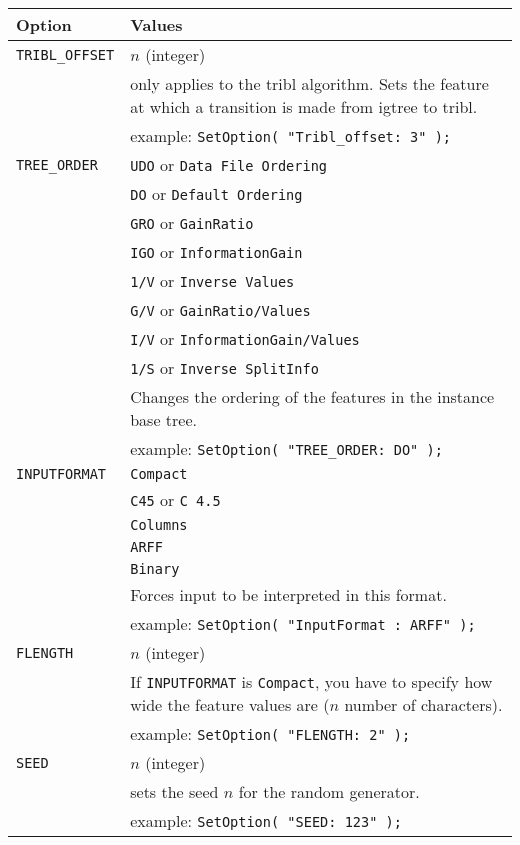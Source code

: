 \documentclass{report}
\begin{document}
\begin{tabular}{|l|p{12cm}|}
\hline
Option & Values\\
\hline
{\tt TRIBL\_OFFSET} & $n$ (integer)\\
		 & only applies to the {\sc tribl} algorithm. Sets the
feature at which a transition is made from {\sc igtree} to {\sc tribl}.\\
		 & example: {\tt SetOption( "Tribl\_offset: 3" );}\\
\hline
{\tt TREE\_ORDER} & {\tt UDO} or {\tt Data File Ordering}\\ 
                 & {\tt DO}  or {\tt Default Ordering}\\ 
                 & {\tt GRO} or {\tt GainRatio}\\ 
                 & {\tt IGO} or {\tt InformationGain}\\ 
                 & {\tt 1/V} or {\tt Inverse Values}\\ 
                 & {\tt G/V} or {\tt GainRatio/Values}\\ 
                 & {\tt I/V} or {\tt InformationGain/Values}\\ 
                 & {\tt 1/S} or {\tt Inverse SplitInfo}\\  
		 & Changes the ordering of the features in the instance base tree.\\
		 & example: {\tt SetOption( "TREE\_ORDER: DO" );}\\
\hline
{\tt INPUTFORMAT} & {\tt Compact}\\
                  & {\tt C45} or {\tt C 4.5}\\
                  & {\tt Columns}\\
                  & {\tt ARFF}\\
                  & {\tt Binary}\\
		  & Forces input to be interpreted in this format.\\
		  & example: {\tt SetOption( "InputFormat : ARFF" );}\\
\hline
{\tt FLENGTH}     & $n$ (integer)\\
		  & If {\tt INPUTFORMAT} is {\tt Compact}, you have to specify how wide the feature values are ($n$ number of characters).\\
		  & example: {\tt SetOption( "FLENGTH: 2" );}\\
\hline
{\tt SEED}        & $n$ (integer)\\
		  & sets the seed $n$ for the random generator.\\
		  & example: {\tt SetOption( "SEED: 123" );}\\

\end{tabular}
\end{document}
